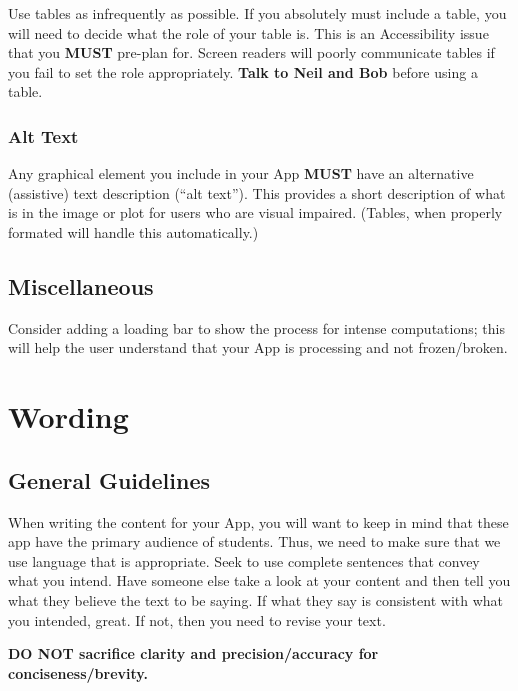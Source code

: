 \documentclass[]{book}
\begin{document}
Use tables as infrequently as possible. If you absolutely must include a table, you will need to decide what the role of your table is. This is an Accessibility issue that you \textbf{MUST} pre-plan for. Screen readers will poorly communicate tables if you fail to set the role appropriately. \textbf{Talk to Neil and Bob} before using a table.

\hypertarget{alt-text}{%
\subsection{Alt Text}\label{alt-text}}

Any graphical element you include in your App \textbf{MUST} have an alternative (assistive) text description (``alt text''). This provides a short description of what is in the image or plot for users who are visual impaired. (Tables, when properly formated will handle this automatically.)

\hypertarget{miscellaneous}{%
\section{Miscellaneous}\label{miscellaneous}}

Consider adding a loading bar to show the process for intense computations; this will help the user understand that your App is processing and not frozen/broken.

\hypertarget{wording}{%
\chapter{Wording}\label{wording}}

\hypertarget{general-guidelines}{%
\section{General Guidelines}\label{general-guidelines}}

When writing the content for your App, you will want to keep in mind that these app have the primary audience of students. Thus, we need to make sure that we use language that is appropriate. Seek to use complete sentences that convey what you intend. Have someone else take a look at your content and then tell you what they believe the text to be saying. If what they say is consistent with what you intended, great. If not, then you need to revise your text.

\textbf{DO NOT sacrifice clarity and precision/accuracy for
conciseness/brevity.}
\end{document}
